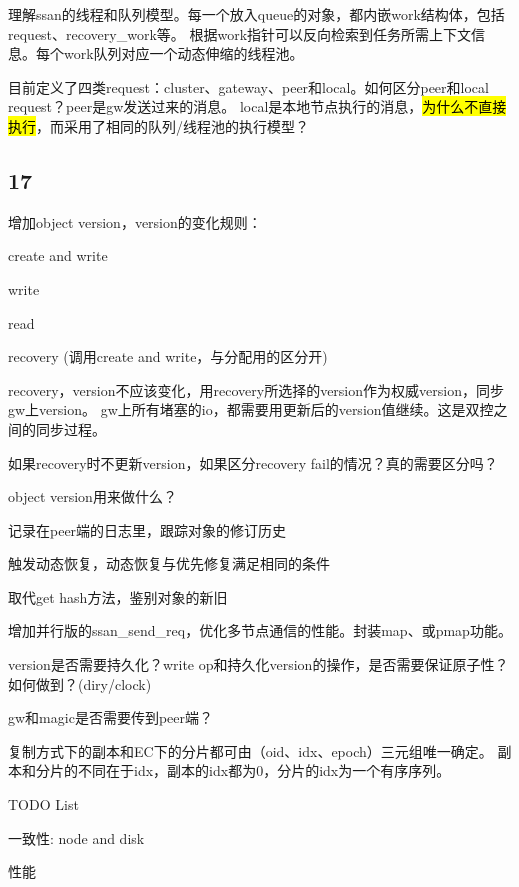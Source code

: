 理解ssan的线程和队列模型。每一个放入queue的对象，都内嵌work结构体，包括request、recovery\_work等。
根据work指针可以反向检索到任务所需上下文信息。每个work队列对应一个动态伸缩的线程池。

目前定义了四类request：cluster、gateway、peer和local。如何区分peer和local request？peer是gw发送过来的消息。
local是本地节点执行的消息，\hl{为什么不直接执行}，而采用了相同的队列/线程池的执行模型？

\subsection{17}

增加object version，version的变化规则：
\begin{enumbox}
\item create and write 
\item write
\item read
\item recovery (调用create and write，与分配用的区分开)
\end{enumbox}

recovery，version不应该变化，用recovery所选择的version作为权威version，同步gw上version。
gw上所有堵塞的io，都需要用更新后的version值继续。这是双控之间的同步过程。

如果recovery时不更新version，如果区分recovery fail的情况？真的需要区分吗？

\hrulefill

object version用来做什么？
\begin{enumbox}
\item 记录在peer端的日志里，跟踪对象的修订历史
\item 触发动态恢复，动态恢复与优先修复满足相同的条件
\item 取代get hash方法，鉴别对象的新旧
\end{enumbox}

\hrulefill

增加并行版的ssan\_send\_req，优化多节点通信的性能。封装map、或pmap功能。

version是否需要持久化？write op和持久化version的操作，是否需要保证原子性？如何做到？(diry/clock)

gw和magic是否需要传到peer端？

复制方式下的副本和EC下的分片都可由（oid、idx、epoch）三元组唯一确定。
副本和分片的不同在于idx，副本的idx都为0，分片的idx为一个有序序列。

\hrulefill

TODO List
\begin{enumbox}
\item 一致性: node and disk
\item 性能
\end{enumbox}

